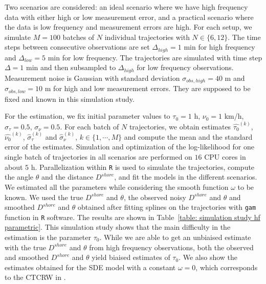 \documentclass[aoas]{imsart}
\theoremstyle{definition}
\theoremstyle{remark}
\theoremstyle{remark}
\newcommand {\1}{\mathbb{1}}
\begin{document}
Two scenarios are considered: an ideal scenario where we have high frequency data with either high or low measurement error, and a practical scenario where the data is low frequency and measurement errors are high. For each setup, we simulate $M=100$ batches of $N$ individual trajectories with $N \in \{6,12\}$. The time steps between consecutive observations are set $\Delta_{high}=1$ min for high frequency and $\Delta_{low}=5$ min for low frequency. The trajectories are simulated with time step $\Delta =1$ min and then subsampled to $\Delta_{high}$ for low frequency observations. Measurement noise is Gaussian with standard deviation $\sigma_{obs,high}=40$ m and $\sigma_{obs,low}=10$ m for high and low measurement errors. They are supposed to be fixed and known in this simulation study.
  
For the estimation, we fix initial parameter values to $\tau_{0}=1$ h, $\nu_{0} = 1$ km/h, $\sigma_{\tau}=0.5$, $\sigma_{\nu}=0.5$. 
For each batch of $N$ trajectories, we obtain estimates $\widehat{\tau_{0}}^{(k)}$, $\widehat{\nu_{0}}^{(k)}$, $\hat{\sigma}_{\tau}^{(k)}$ and $\hat{\sigma}_{\nu}^{(k)}$, $k \in \{1,\cdots,M\}$ and compute the mean  and the standard error of the estimates. Simulation and optimization of the log-likelihood for one single batch of trajectories in all scenarios are performed on $16$ CPU cores in about $5$ h. Parallelization within \texttt{R} is used to simulate the trajectories, compute the angle $\theta$ and the distance $D^{shore}$, and fit the models in the different scenarios. \\


We estimated all the parameters while considering the smooth function $\omega$ to be known. We used the true $D^{shore}$ and $\theta$, the observed noisy $D^{shore}$ and $\theta$ and smoothed $D^{shore}$ and $\theta$ obtained after fitting splines on the trajectories with \texttt{gam} function in \texttt{R} software. The results are shown in Table~\ref{table: simulation study hf parametric}. This simulation study shows that the main difficulty in the estimation is the parameter $\tau_0$. While we are able to get an unbiaised estimate with the true $D^{shore}$ and $\theta$ from high frequency observations, both the observed and smoothed $D^{shore}$ and $\theta$ yield biaised estimates of $\tau_0$. We also show the estimates obtained for the SDE model with a constant $\omega=0$, which corresponds to the CTCRW in \cite{johnson_continuous_2008}.
\end{document}
